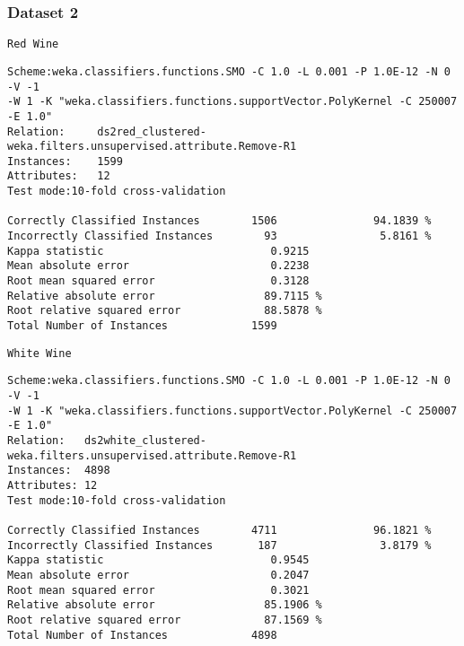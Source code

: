 \documentclass[a4paper,12pt,openany]{report}
\newenvironment{wekaconsole}[1][]{

	\par \noindent
	\begin{samepage}
	\texttt{#1}
	\begin{mdframed}
	\small
	\ttfamily
}{
	\end{mdframed}
	\end{samepage}
}
\begin{document}
\subsubsection*{Dataset 2}
\begin{wekaconsole}[Red Wine]
\begin{verbatim}
Scheme:weka.classifiers.functions.SMO -C 1.0 -L 0.001 -P 1.0E-12 -N 0 -V -1
-W 1 -K "weka.classifiers.functions.supportVector.PolyKernel -C 250007
-E 1.0"
Relation:     ds2red_clustered-weka.filters.unsupervised.attribute.Remove-R1
Instances:    1599
Attributes:   12
Test mode:10-fold cross-validation

Correctly Classified Instances        1506               94.1839 %
Incorrectly Classified Instances        93                5.8161 %
Kappa statistic                          0.9215
Mean absolute error                      0.2238
Root mean squared error                  0.3128
Relative absolute error                 89.7115 %
Root relative squared error             88.5878 %
Total Number of Instances             1599     
\end{verbatim}
\end{wekaconsole}

\begin{wekaconsole}[White Wine]
\begin{verbatim}
Scheme:weka.classifiers.functions.SMO -C 1.0 -L 0.001 -P 1.0E-12 -N 0 -V -1
-W 1 -K "weka.classifiers.functions.supportVector.PolyKernel -C 250007
-E 1.0"
Relation:   ds2white_clustered-weka.filters.unsupervised.attribute.Remove-R1
Instances:  4898
Attributes: 12
Test mode:10-fold cross-validation

Correctly Classified Instances        4711               96.1821 %
Incorrectly Classified Instances       187                3.8179 %
Kappa statistic                          0.9545
Mean absolute error                      0.2047
Root mean squared error                  0.3021
Relative absolute error                 85.1906 %
Root relative squared error             87.1569 %
Total Number of Instances             4898
\end{verbatim}
\end{wekaconsole}
\end{document}

